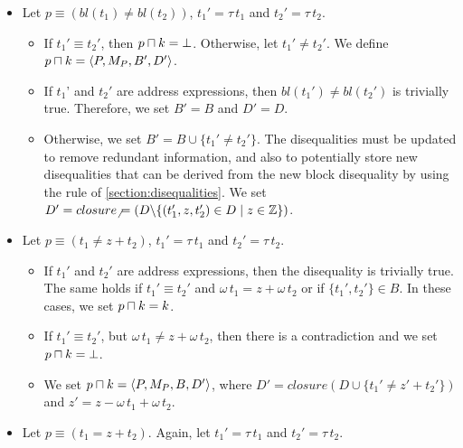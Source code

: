 \begin{itemize}
    \item Let $p \equiv (bl(t_1) \neq bl(t_2))$, $t_1'=\tau\,t_1$ and $t_2'=\tau\,t_2$.
    \begin{itemize}
        \item If $t_1' \equiv t_2'$, then $p \sqcap k = \bot$.
         Otherwise, let $t_1' \neq t_2'$. We define $p \sqcap k = \langle P,M_P,B', D'\rangle$.
         \item If $t_1$' and $t_2'$ are address expressions, then $bl(t_1') \neq bl(t_2')$ is trivially true.
          Therefore, we set $B'= B$ and $D'=D$. 
          \item Otherwise, we set $B' = B \cup \{t_1' \neq t_2'\}$.
          The disequalities must be updated to remove redundant information, and also to
          potentially store new disequalities that can be derived from the new block disequality by using the rule
           of \cref{section:disequalities}.
        We set $D' = closure_\neq(D \backslash \{(t_1',z,t_2') \in D \mid z \in \mathbb{Z}\})$.
    \end{itemize}
    \item Let $p \equiv (t_1 \neq z + t_2)$, $t_1'=\tau\,t_1$ and $t_2'=\tau\,t_2$.
    \begin{itemize}
        \item If $t_1'$ and $t_2'$ are address expressions, then the disequality is trivially true.
        The same holds if $t_1' \equiv t_2'$ and $\omega\,t_1 = z + \omega\,t_2$
        or if $\{t_1',t_2'\}\in B$. In these cases, we set $p \sqcap k = k$.
         \item If $t_1' \equiv t_2'$, but $\omega\,t_1 \neq z + \omega\,t_2$, then
         there is a contradiction and we set $p \sqcap k = \bot$.
         \item We set $p \sqcap k = \langle P,M_P,B,D'\rangle$, where $D' = closure(D \cup \{t_1' \neq z' + t_2'\})$
         and $z' = z - \omega\,t_1 + \omega\,t_2$.
    \end{itemize}
    \item Let $p \equiv (t_1 = z + t_2)$. Again, let $t_1'=\tau\,t_1$ and $t_2'=\tau\,t_2$.
    \begin{itemize}

\end{itemize}
\end{itemize}
